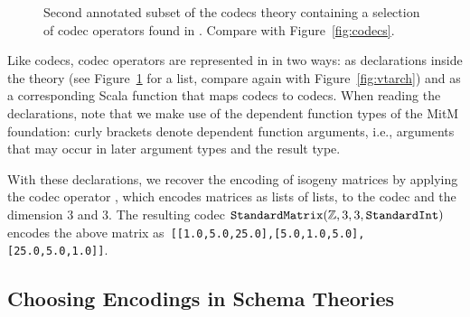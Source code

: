 \begin{figure}[ht]\centering
  \caption[List of Codec Operators]{
    Second annotated subset of the codecs theory containing a selection of codec operators found in \mmt. 
    Compare with Figure~\ref{fig:codecs}. 
  }
  \label{fig:codecops}
\end{figure}
Like codecs, codec operators are represented in \mmt in two ways: as declarations inside the theory  (see Figure~\ref{fig:codecops} for a list, compare again with Figure~\ref{fig:vtarch}) and as a corresponding Scala function that maps codecs to codecs. 
When reading the declarations, note that we make use of the dependent function types of the MitM foundation: curly brackets denote dependent function arguments, i.e., arguments that may occur in later argument types and the result type.

With these declarations, we recover the \lmfdb encoding of isogeny matrices by applying the codec operator , which encodes matrices as lists of lists, to the codec  and the dimension $3$ and $3$.
The resulting codec $\plaintt{StandardMatrix}(\mathbb{Z}, 3, 3, \plaintt{StandardInt})$ encodes the above matrix as\ \lstinline|[[1.0,5.0,25.0],[5.0,1.0,5.0],[25.0,5.0,1.0]]|.

\subsection{Choosing Encodings in Schema Theories}\label{sec:vt:schema}

